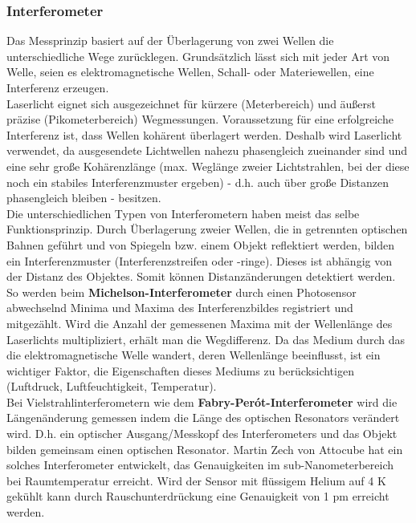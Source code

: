 			\subsubsection{Interferometer}
				Das Messprinzip basiert auf der Überlagerung von zwei Wellen die unterschiedliche Wege zurücklegen. Grundsätzlich lässt sich mit jeder Art von Welle, seien es elektromagnetische Wellen, Schall- oder Materiewellen, eine Interferenz erzeugen.\\ Laserlicht eignet sich ausgezeichnet für kürzere (Meterbereich) und äußerst präzise (Pikometerbereich) Wegmessungen. Voraussetzung für eine erfolgreiche Interferenz ist, dass Wellen kohärent überlagert werden. Deshalb wird Laserlicht verwendet, da ausgesendete Lichtwellen nahezu phasengleich zueinander sind und eine sehr große Kohärenzlänge (max. Weglänge zweier Lichtstrahlen, bei der diese noch ein stabiles Interferenzmuster ergeben) - d.h. auch über große Distanzen phasengleich bleiben - besitzen. \\
				Die unterschiedlichen Typen von Interferometern haben meist das selbe Funktionsprinzip. Durch Überlagerung zweier Wellen, die in getrennten optischen Bahnen geführt und von Spiegeln bzw. einem Objekt reflektiert werden, bilden ein Interferenzmuster (Interferenzstreifen oder -ringe). Dieses ist abhängig von der Distanz des Objektes. Somit können Distanzänderungen detektiert werden.\\
				So werden beim \textbf{Michelson-Interferometer} durch einen Photosensor abwechselnd Minima und Maxima des Interferenzbildes registriert und mitgezählt. Wird die Anzahl der gemessenen Maxima mit der Wellenlänge des Laserlichts multipliziert, erhält man die Wegdifferenz. Da das Medium durch das die elektromagnetische Welle wandert, deren Wellenlänge beeinflusst, ist ein wichtiger Faktor, die Eigenschaften dieses Mediums zu berücksichtigen (Luftdruck, Luftfeuchtigkeit, Temperatur).\\
				Bei Vielstrahlinterferometern wie dem \textbf{Fabry-Per\'{o}t-Interferometer} wird die Längenänderung gemessen indem die Länge des optischen Resonators verändert wird. D.h. ein optischer Ausgang/Messkopf des Interferometers und das Objekt bilden gemeinsam einen optischen Resonator. Martin Zech von Attocube hat ein solches Interferometer entwickelt, das Genauigkeiten im sub-Nanometerbereich bei Raumtemperatur erreicht. Wird der Sensor mit flüssigem Helium auf 4 K gekühlt kann durch Rauschunterdrückung eine Genauigkeit von 1 pm erreicht werden.\\
		
